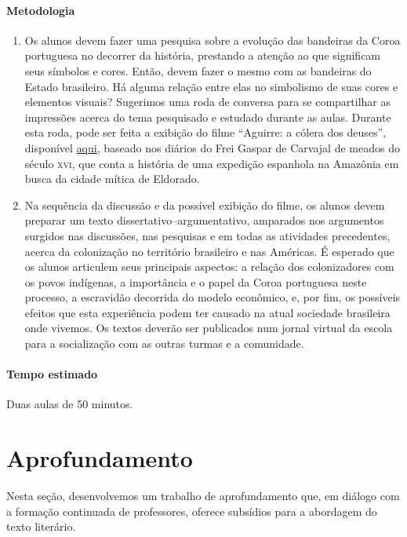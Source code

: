 \documentclass[12pt]{extarticle}
\begin{document}
{\paragraph{Metodologia}
\begin{enumerate}
\item 
Os alunos devem fazer uma pesquisa sobre a evolução das bandeiras da Coroa
portuguesa no decorrer da história, prestando a atenção ao que significam
seus símbolos e cores. Então, devem fazer o mesmo com as bandeiras do 
Estado brasileiro. Há alguma relação entre elas no simbolismo de suas
cores e elementos visuais? Sugerimos uma roda de conversa para se 
compartilhar as impressões acerca do tema pesquisado e estudado durante
as aulas. Durante esta roda, pode ser feita a exibição do filme ``Aguirre: 
a cólera dos deuses'', disponível \href{https://www.youtube.com/watch?v=weuYp-XFxAo}{aqui}, baseado nos diários do Frei Gaspar de Carvajal 
de meados do século \textsc{xvi}, que conta a história de uma expedição 
espanhola na Amazônia em busca da cidade mítica de Eldorado.

\item 
Na sequência da discussão e da possível exibição do filme, os alunos devem 
preparar um texto dissertativo--argumentativo, amparados nos argumentos 
surgidos nas discussões, nas pesquisas e em todas as atividades 
precedentes, acerca da colonização no território brasileiro e nas Américas. 
É esperado que os alunos articulem seus principais aspectos:
a relação dos colonizadores com os povos indígenas, a importância e o papel
da Coroa portuguesa neste processo, a escravidão decorrida do modelo 
econômico, e, por fim, os possíveis efeitos que esta experiência podem 
ter causado na atual sociedade brasileira onde vivemos.
Os textos deverão ser publicados num jornal virtual da escola para a 
socialização com as outras turmas e a comunidade.

\end{enumerate}

\paragraph{Tempo estimado} Duas aulas de 50 minutos.


\section{Aprofundamento}


Nesta seção, desenvolvemos um trabalho de aprofundamento que, em diálogo
com a formação continuada de professores, oferece subsídios para a
abordagem do texto literário.

}
\end{document}
